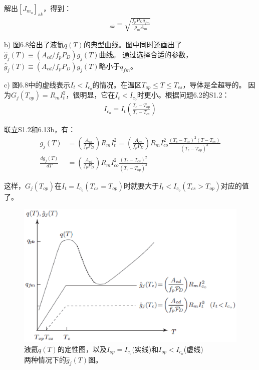 解出$[J_{m_o}]_{sk}$，得到：
\begin{align*}%
[J_{m_o}]_{sk}=\sqrt{\frac{f_pP_Dq_{fm}}{\rho_mA_m}} \tag{6.22}
\end{align*}

b) 图6.8给出了液氦$q(T)$的典型曲线。图中同时还画出了$\hat{g}_j(T)\equiv (A_{cd}/f_p P_D)g_j(T)$曲线。
通过选择合适的参数，$\hat{g}_j(T)\equiv (A_{cd}/f_p P_D)g_j(T)$略小于$q_{fm}$。

c) 图6.8中的虚线表示$I_t<I_{c_o}$的情况。在温区$T_{op}\le T\le T_{cs}$，导体是全超导的。
因为$G_j(T_{op})=R_m I_t^2$，很明显，它在$I_t<I_{c_o}$时更小。根据问题6.2的S1.2：
\begin{align*}%
I_{c_o}=I_t(\frac{T_c-T_{op} }{T_c-T_{cs}}) \tag{S1.2}
\end{align*}

联立S1.2和6.13b，有：
\begin{align*}%
g_j(T)&=(\frac{A_{cd}}{f_pP_D})R_mI_t^2=(\frac{A_{cd}}{f_pP_D})R_mI_{co}^2\frac{(T_c-T_{cs})^2(T-T_{cs})}{(T_c-T_{op})^3}\\
\frac{dg_j(T)}{dT}&=(\frac{A_{cd}}{f_pP_D})R_mI_{co}^2\frac{(T_c-T_{cs})^2}{(T_c-T_{op})^3}
\end{align*}

这样，$G_j(T_{op})$在$I_t=I_{c_o}(T_{cs}=T_{op})$时就要大于$I_t<I_{c_o}(T_{cs}>T_{op})$对应的值了。
\begin{figure}[htbp]
	\centering
	\includegraphics[scale=0.7]{chpt6/figs/fig6.8.eps}
	\caption{液氦$q(T)$的定性图，以及$I_{op}=I_{c_o}$(实线)和$I_{op}<I_{c_o}$(虚线)$两种情况下的$$\hat{g}_j(T)$图。}
\end{figure}


